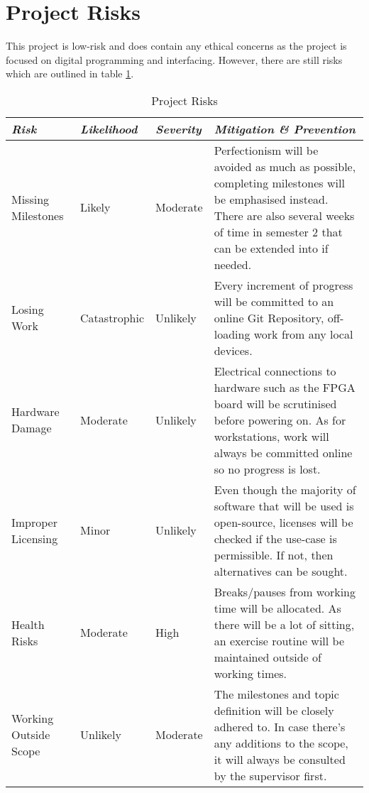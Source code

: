 \clearpage
\section{Project Risks}
This project is low-risk and does contain any ethical concerns as the project is focused on digital programming and interfacing. However, there are still risks which are outlined in table \ref{table:Project Risks}.

\begin{table}[hbt!]
    \centering
        \caption{Project Risks}\label{table:Project Risks}
        \begin{tabularx}{\textwidth}{ lllX }
            \hline
            \textit{Risk} & \textit{Likelihood} & \textit{Severity} & \textit{Mitigation \& Prevention} \\ 
            \hline
            Missing Milestones & Likely & Moderate & Perfectionism will be avoided as much as possible, completing milestones will be emphasised instead. There are also several weeks of time in semester 2 that can be extended into if needed. \\
            \hline
            Losing Work & Catastrophic & Unlikely & Every increment of progress will be committed to an online Git Repository, off-loading work from any local devices. \\
            \hline
            Hardware Damage & Moderate & Unlikely & Electrical connections to hardware such as the FPGA board will be scrutinised before powering on. As for workstations, work will always be committed online so no progress is lost. \\
            \hline
            Improper Licensing & Minor & Unlikely & Even though the majority of software that will be used is open-source, licenses will be checked if the use-case is permissible. If not, then alternatives can be sought. \\
            \hline
            Health Risks & Moderate & High & Breaks/pauses from working time will be allocated. As there will be a lot of sitting, an exercise routine will be maintained outside of working times. \\
            \hline
            Working Outside Scope & Unlikely & Moderate & The milestones and topic definition will be closely adhered to. In case there's any additions to the scope, it will always be consulted by the supervisor first. \\
            \hline
        \end{tabularx}
    \end{table}